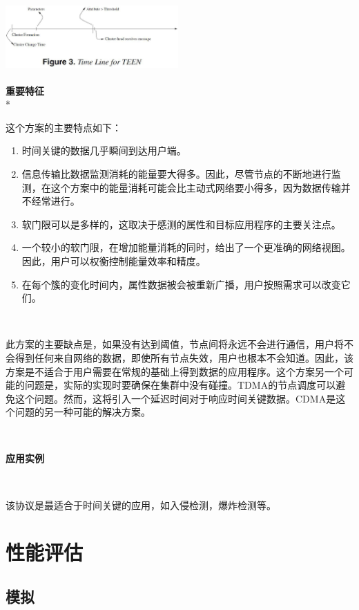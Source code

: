 \documentclass[journal]{IEEEtran}
\begin{document}
\begin{CJK}{UTF8}{gbsn}
\noindent
\includegraphics[height=100, width=250]{3.eps}

\textbf{重要特征}
\\*

这个方案的主要特点如下：
\\
\begin{enumerate}
 \setcounter{enumi}
 \item 时间关键的数据几乎瞬间到达用户端。
 \item 信息传输比数据监测消耗的能量要大得多。因此，尽管节点的不断地进行监测，在这个方案中的能量消耗可能会比主动式网络要小得多，因为数据传输并不经常进行。  \item 软门限可以是多样的，这取决于感测的属性和目标应用程序的主要关注点。
 \item 一个较小的软门限，在增加能量消耗的同时，给出了一个更准确的网络视图。因此，用户可以权衡控制能量效率和精度。
 \item 在每个簇的变化时间内，属性数据被会被重新广播，用户按照需求可以改变它们。
 \end{enumerate}

\

此方案的主要缺点是，如果没有达到阈值，节点间将永远不会进行通信，用户将不会得到任何来自网络的数据，即使所有节点失效，用户也根本不会知道。因此，该方案是不适合于用户需要在常规的基础上得到数据的应用程序。这个方案另一个可能的问题是，实际的实现时要确保在集群中没有碰撞。TDMA的节点调度可以避免这个问题。然而，这将引入一个延迟时间对于响应时间关键数据。CDMA是这个问题的另一种可能的解决方案。

\

\textbf{应用实例}

\

该协议是最适合于时间关键的应用，如入侵检测，爆炸检测等。

\section{\textbf{性能评估}}

\subsection{\textbf{模拟}}


\end{CJK}
\end{document}
